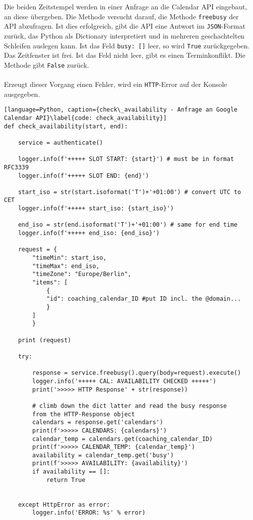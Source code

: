             Die beiden Zeitstempel werden in einer Anfrage an die Calendar API eingebaut, an diese übergeben. Die Methode versucht darauf, die Methode \verb|freebusy| der API abzufragen. Ist dies erfolgreich, gibt die API eine Antwort im \verb|JSON|-Format zurück, das Python als Dictionary interpretiert und in mehreren geschachtelten Schleifen auslegen kann. Ist das Feld \verb|busy: []| leer, so wird \verb|True| zurückgegeben. Das Zeitfenster ist frei. Ist das Feld nicht leer, gibt es einen Terminkonflikt. Die Methode gibt \verb|False| zurück. \\
            \\
            Erzeugt dieser Vorgang einen Fehler, wird ein \verb|HTTP|-Error auf der Konsole ausgegeben. \\
            \begin{lstlisting}[language=Python, caption={check\_availability - Anfrage an Google Calendar API}\label{code: check_availability}]
def check_availability(start, end):

    service = authenticate()
    
    logger.info(f'+++++ SLOT START: {start}') # must be in format RFC3339
    logger.info(f'+++++ SLOT END: {end}')

    start_iso = str(start.isoformat('T')+'+01:00') # convert UTC to CET
    logger.info(f'+++++ start_iso: {start_iso}')

    end_iso = str(end.isoformat('T')+'+01:00') # same for end time
    logger.info(f'+++++ end_iso: {end_iso}')

    request = {
        "timeMin": start_iso,
        "timeMax": end_iso,
        "timeZone": "Europe/Berlin", 
        "items": [
            {
            "id": coaching_calendar_ID #put ID incl. the @domain...
            }
        ]
        }

    print (request)
    
    try:
        
        response = service.freebusy().query(body=request).execute()
        logger.info('+++++ CAL: AVAILABILITY CHECKED +++++')
        print('>>>>> HTTP Response' + str(response))
    
        # climb down the dict latter and read the busy response 
        from the HTTP-Response object
        calendars = response.get('calendars')
        print(f'>>>>> CALENDARS: {calendars}')
        calendar_temp = calendars.get(coaching_calendar_ID)
        print(f'>>>>> CALENDAR_TEMP: {calendar_temp}')
        availability = calendar_temp.get('busy')
        print(f'>>>>> AVAILABILITY: {availability}')
        if availability == []:
            return True


    except HttpError as error:
        logger.info('ERROR: %s' % error)
                \end{lstlisting}

